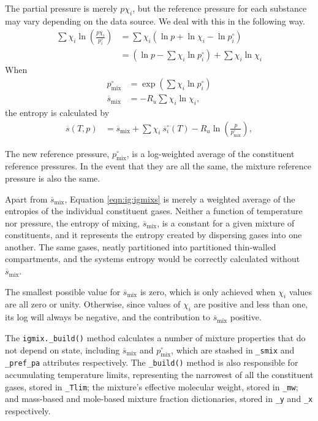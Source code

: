 The partial pressure is merely $p \chi_i$, but the reference pressure for each substance may vary depending on the data source.  We deal with this in the following way.
\begin{align*}
\sum \chi_i \ln\left(\frac{p \chi_i}{p^\circ_i}\right) &= \sum \chi_i \left( \ln p + \ln \chi_i - \ln p^\circ_i \right)\\
&= \left( \ln p - \sum \chi_i \ln p^\circ_i\right) + \sum \chi_i \ln \chi_i
\end{align*}
When
\begin{align}
p^\circ_\mathrm{mix} &= \exp\left(\sum \chi_i \ln p^\circ_i \right)\\
\overline{s}_\mathrm{mix} &= -R_u \sum \chi_i \ln \chi_i,
\end{align}
the entropy is calculated by
\begin{align*}
\overline{s}(T,p) &= \overline{s}_\mathrm{mix} + \sum \chi_i\ \overline{s}^\circ_i(T) - R_u \ln\left( \frac{p}{p^\circ_\mathrm{mix}} \right),\label{eqn:ig:igmixs}
\end{align*}

The new reference pressure, $p^\circ_\mathrm{mix}$, is a log-weighted average of the constituent reference pressures.  In the event that they are all the same, the mixture reference pressure is also the same.  

Apart from $\overline{s}_\mathrm{mix}$, Equation \ref{eqn:ig:igmixs} is merely a weighted average of the entropies of the individual constituent gases.  Neither a function of temperature nor pressure, the entropy of mixing, $\overline{s}_\mathrm{mix}$, is a constant for a given mixture of constituents, and it represents the entropy created by dispersing gases into one another.  The same gases, neatly partitioned into partitioned thin-walled compartments, and the systems entropy would be correctly calculated without $\overline{s}_\mathrm{mix}$.  

The smallest possible value for $\overline{s}_\mathrm{mix}$ is zero, which is only achieved when $\chi_i$ values are all zero or unity.  Otherwise, since values of $\chi_i$ are positive and less than one, its log will always be negative, and the contribution to $\overline{s}_\mathrm{mix}$ positive.  

The \verb|igmix._build()| method calculates a number of mixture properties that do not depend on state, including $\overline{s}_\mathrm{mix}$ and $p^\circ_\mathrm{mix}$, which are stashed in \verb|_smix| and \verb|_pref_pa| attributes respectively.  The \verb|_build()| method is also responsible for accumulating temperature limits, representing the narrowest of all the constituent gases, stored in \verb|_Tlim|; the mixture's effective molecular weight, stored in \verb|_mw|; and mass-based and mole-based mixture fraction dictionaries, stored in \verb|_y| and \verb|_x| respectively.

